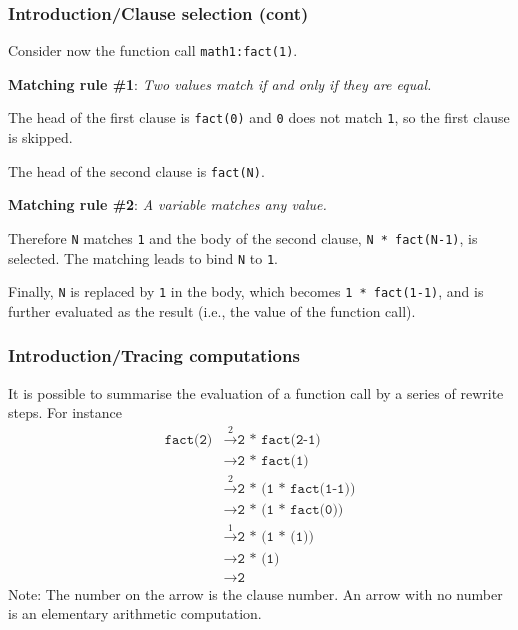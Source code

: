 %
\begin{frame}
\frametitle{Introduction/Clause selection (cont)}

Consider now the function call \texttt{math1:fact(1)}.
\begin{center}
\textbf{Matching rule \#1}: \emph{Two values match if and only if they
  are equal.}
\end{center}
The head of the first clause is \texttt{fact(0)} and \texttt{0} does
not match \texttt{1}, so the first clause is skipped.

\bigskip

The head of the second clause is \texttt{fact(N)}. 
\begin{center}
\textbf{Matching rule \#2}: \emph{A variable matches any value.}
\end{center}
Therefore \texttt{N} matches \texttt{1} and the body of the second
clause, \texttt{N * fact(N-1)}, is selected. The matching leads to
bind \texttt{N} to \texttt{1}.

\bigskip

Finally, \texttt{N} is replaced by \texttt{1} in the body, which
becomes \texttt{1 * fact(1-1)}, and is further evaluated as the
result (i.e., the value of the function call).

\end{frame}

%
\begin{frame}
\frametitle{Introduction/Tracing computations}

It is possible to summarise the evaluation of a function call by a
series of rewrite steps. For instance
\begin{align*}
\texttt{fact(2)}
  & \stackrel{2}{\longrightarrow} \texttt{2 * fact(2-1)}\\
  & \longrightarrow \texttt{2 * fact(1)}\\
  & \stackrel{2}{\longrightarrow} \texttt{2 * (1 * fact(1-1))}\\
  & \longrightarrow \texttt{2 * (1 * fact(0))}\\
  & \stackrel{1}{\longrightarrow} \texttt{2 * (1 * (1))}\\
  & \longrightarrow \texttt{2 * (1)}\\
  & \longrightarrow \texttt{2}
\end{align*}
Note: The number on the arrow is the clause number. An arrow with no
number is an elementary arithmetic computation.

\end{frame}

